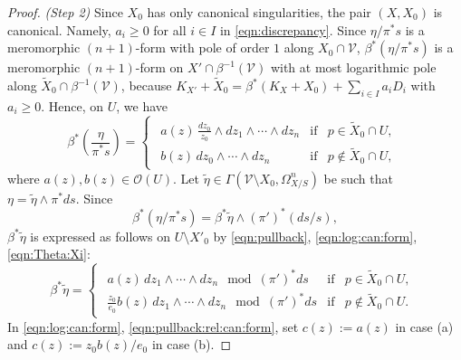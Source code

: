 \documentclass[amscd, leqno]{amsart}
\theoremstyle{plain}
\theoremstyle{definition}
\theoremstyle{remark}
\newenvironment{pf}{\begin{proof}}{\end{proof}}
\begin{document}
\begin{pf}
\par{\em (Step 2) }
Since $X_{0}$ has only canonical singularities, the pair $(X, X_{0})$ is canonical. 
Namely, $a_{i} \geq 0$ for all $i \in I$ in \eqref{eqn:discrepancy}.
Since $\eta/\pi^{*}s$ is a meromorphic $(n+1)$-form with pole of order $1$ along $X_{0}\cap {\mathcal V}$,  
$\beta^{*}(\eta/\pi^{*}s)$ is a meromorphic $(n+1)$-form on $X' \cap \beta^{-1}({\mathcal V})$ with at most logarithmic pole along 
$\widetilde{X}_{0}\cap\beta^{-1}({\mathcal V})$, 
because $K_{X'}+\widetilde{X}_{0}=\beta^{*}(K_{X}+X_{0})+\sum_{i\in I}a_{i}D_{i}$ with $a_{i}\geq0$. 
Hence, on $U$, we have
\begin{equation}
\label{eqn:log:can:form}
\beta^{*}\left(\frac{\eta}{\pi^{*}s}\right)
=
\begin{cases}
\begin{array}{lll}
a(z)\,\frac{dz_{0}}{z_{0}}\wedge dz_{1}\wedge\cdots\wedge dz_{n} & \text{if} & p\in\widetilde{X}_{0}\cap U,
\\
b(z)\,dz_{0}\wedge\cdots\wedge dz_{n} & \text{if} & p\not\in\widetilde{X}_{0}\cap U,
\end{array}
\end{cases}
\end{equation}
where $a(z),b(z)\in{\mathcal O}(U)$. Let $\widetilde{\eta}\in\Gamma({\mathcal V}\setminus X_{0},\Omega^{n}_{X/S})$ be such that 
$\eta=\widetilde{\eta}\wedge\pi^{*}ds$. Since
\begin{equation}
\label{eqn:Theta:Xi}
\beta^{*}(\eta/\pi^{*}s) = \beta^{*}\widetilde{\eta} \wedge (\pi')^{*}(ds/s),
\end{equation}
$\beta^{*}\widetilde{\eta}$ is expressed as follows on $U\setminus X'_{0}$ by 
\eqref{eqn:pullback}, \eqref{eqn:log:can:form}, \eqref{eqn:Theta:Xi}:
\begin{equation}
\label{eqn:pullback:rel:can:form}
\beta^{*}\widetilde{\eta}
=
\begin{cases}
\begin{array}{lll}
a(z)\,dz_{1}\wedge\cdots\wedge dz_{n}\mod(\pi')^{*}ds & \text{if} & p\in\widetilde{X}_{0}\cap U,
\\
\frac{z_{0}}{e_{0}}b(z)\,dz_{1}\wedge\cdots\wedge dz_{n} \mod(\pi')^{*}ds & \text{if} & p\not\in\widetilde{X}_{0}\cap U.
\end{array}
\end{cases}
\end{equation}
In \eqref{eqn:log:can:form}, \eqref{eqn:pullback:rel:can:form}, set $c(z):=a(z)$ in case (a) and $c(z):=z_{0}b(z)/e_{0}$ in case (b). 

\end{pf}
\end{document}
